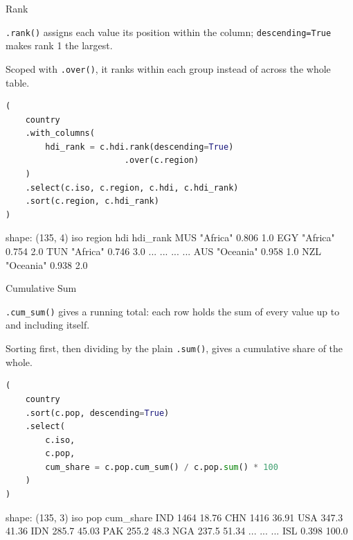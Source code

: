 \documentclass[8pt,aspectratio=169]{beamer}
\begin{document}
\begin{frame}[fragile]{Rank}
\begin{splitcode}{%

\texttt{.rank()} assigns each value its position within the column; \texttt{descending=True} makes rank 1 the largest.

Scoped with \texttt{.over()}, it ranks within each group instead of across the whole table.

}
\begin{lstlisting}[language=Python]
(
    country
    .with_columns(
        hdi_rank = c.hdi.rank(descending=True)
                        .over(c.region)
    )
    .select(c.iso, c.region, c.hdi, c.hdi_rank)
    .sort(c.region, c.hdi_rank)
)
\end{lstlisting}
\begin{codeoutput}
shape: (135, 4)
iso  region      hdi    hdi_rank
MUS  "Africa"    0.806  1.0
EGY  "Africa"    0.754  2.0
TUN  "Africa"    0.746  3.0
...  ...         ...    ...
AUS  "Oceania"   0.958  1.0
NZL  "Oceania"   0.938  2.0
\end{codeoutput}
\end{splitcode}
\end{frame}

\begin{frame}[fragile]{Cumulative Sum}
\begin{splitcode}{%

\texttt{.cum\_sum()} gives a running total: each row holds the sum of every value up to and including itself.

Sorting first, then dividing by the plain \texttt{.sum()}, gives a cumulative share of the whole.

}
\begin{lstlisting}[language=Python]
(
    country
    .sort(c.pop, descending=True)
    .select(
        c.iso,
        c.pop,
        cum_share = c.pop.cum_sum() / c.pop.sum() * 100
    )
)
\end{lstlisting}
\begin{codeoutput}
shape: (135, 3)
iso  pop    cum_share
IND  1464   18.76
CHN  1416   36.91
USA  347.3  41.36
IDN  285.7  45.03
PAK  255.2  48.3
NGA  237.5  51.34
...  ...    ...
ISL  0.398  100.0
\end{codeoutput}
\end{splitcode}
\end{frame}
\end{document}
